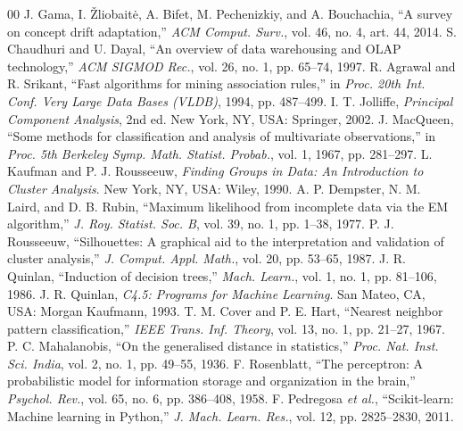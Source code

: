 \documentclass[conference]{IEEEtran}
\begin{document}
\begin{thebibliography}{00}
 J. Gama, I. \v{Z}liobait\.{e}, A. Bifet, M. Pechenizkiy, and A. Bouchachia, ``A survey on concept drift adaptation,'' \emph{ACM Comput. Surv.}, vol. 46, no. 4, art. 44, 2014.
 S. Chaudhuri and U. Dayal, ``An overview of data warehousing and OLAP technology,'' \emph{ACM SIGMOD Rec.}, vol. 26, no. 1, pp. 65--74, 1997.
 R. Agrawal and R. Srikant, ``Fast algorithms for mining association rules,'' in \emph{Proc. 20th Int. Conf. Very Large Data Bases (VLDB)}, 1994, pp. 487--499.
 I. T. Jolliffe, \emph{Principal Component Analysis}, 2nd ed. New York, NY, USA: Springer, 2002.
 J. MacQueen, ``Some methods for classification and analysis of multivariate observations,'' in \emph{Proc. 5th Berkeley Symp. Math. Statist. Probab.}, vol. 1, 1967, pp. 281--297.
 L. Kaufman and P. J. Rousseeuw, \emph{Finding Groups in Data: An Introduction to Cluster Analysis}. New York, NY, USA: Wiley, 1990.
 A. P. Dempster, N. M. Laird, and D. B. Rubin, ``Maximum likelihood from incomplete data via the EM algorithm,'' \emph{J. Roy. Statist. Soc. B}, vol. 39, no. 1, pp. 1--38, 1977.
 P. J. Rousseeuw, ``Silhouettes: A graphical aid to the interpretation and validation of cluster analysis,'' \emph{J. Comput. Appl. Math.}, vol. 20, pp. 53--65, 1987.
 J. R. Quinlan, ``Induction of decision trees,'' \emph{Mach. Learn.}, vol. 1, no. 1, pp. 81--106, 1986.
 J. R. Quinlan, \emph{C4.5: Programs for Machine Learning}. San Mateo, CA, USA: Morgan Kaufmann, 1993.
 T. M. Cover and P. E. Hart, ``Nearest neighbor pattern classification,'' \emph{IEEE Trans. Inf. Theory}, vol. 13, no. 1, pp. 21--27, 1967.
 P. C. Mahalanobis, ``On the generalised distance in statistics,'' \emph{Proc. Nat. Inst. Sci. India}, vol. 2, no. 1, pp. 49--55, 1936.
 F. Rosenblatt, ``The perceptron: A probabilistic model for information storage and organization in the brain,'' \emph{Psychol. Rev.}, vol. 65, no. 6, pp. 386--408, 1958.
 F. Pedregosa \emph{et al.}, ``Scikit-learn: Machine learning in Python,'' \emph{J. Mach. Learn. Res.}, vol. 12, pp. 2825--2830, 2011.
\end{thebibliography}
\end{document}
